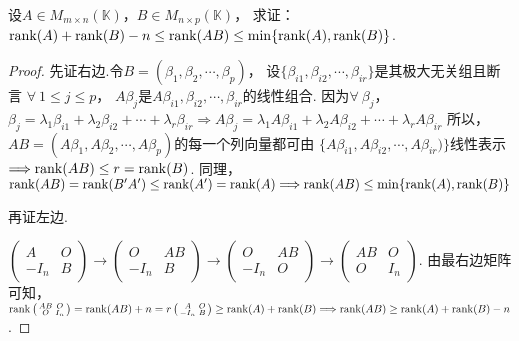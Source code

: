\begin{example}
  设\( A \in M_{m\times n}(\mathbb{K}) \)，\( B \in M_{n\times p}(\mathbb{K}) \)，
  求证：\( \operatorname{rank}(A)+\operatorname{rank}(B)-n\leq \operatorname{rank}(AB)\leq \min\{\operatorname{rank}(A),\operatorname{rank}(B)\} \).
\end{example}

\begin{proof}
  先证右边.令\( B=(\beta_1,\beta_2,\cdots,\beta_p) \)，
  设\(\{\beta_{i1},\beta_{i2},\cdots,\beta_{ir}\}\)是其极大无关组且断言
  \( \forall ~1 \leq j \leq p \)，
  \( A\beta_j \)是\(A\beta_{i1},\beta_{i2},\cdots,\beta_{ir}\)的线性组合.
  因为\( \forall ~\beta_j \)，
  \(\beta_j = \lambda_1\beta_{i1}+\lambda_2\beta_{i2}+\cdots+\lambda_r\beta_{ir}
  \Longrightarrow
  A\beta_j=\lambda_1 A \beta_{i1}+\lambda_2 A \beta_{i2}+\cdots+\lambda_r A \beta_{ir}\)
  所以，\( AB=(A\beta_1,A\beta_2,\cdots,A\beta_p)\)的每一个列向量都可由
  \( \{A\beta_{i1},A\beta_{i2},\cdots,A\beta_{ir})\} \)线性表示
  \( \Longrightarrow \operatorname{rank}(AB) \leq r = \operatorname{rank}(B)\).
  同理，\( \operatorname{rank}(AB)=\operatorname{rank}(B'A')\leq \operatorname{rank}(A')=\operatorname{rank}(A) \Longrightarrow
  \operatorname{rank}(AB) \leq \min\{\operatorname{rank}(A),\operatorname{rank}(B)\}\)

  再证左边.

  \( \left(\begin{smallmatrix}
      A & O \\
      -I_n & B \end{smallmatrix}\right) \longrightarrow
      \left(\begin{smallmatrix}
      O & AB \\
      -I_n & B \end{smallmatrix}\right) \longrightarrow
      \left(\begin{smallmatrix}
      O & AB \\
      -I_n & O \end{smallmatrix}\right) \longrightarrow
      \left(\begin{smallmatrix}
      AB & O \\
      O  & I_n \end{smallmatrix}\right)\).
  由最右边矩阵可知， \( \operatorname{rank}\left(\begin{smallmatrix}
      AB & O \\
      O  & I_n\end{smallmatrix}\right) = \operatorname{rank}(AB)+n=
      r\left(\begin{smallmatrix}
      A & O \\
      -I_n & B \end{smallmatrix}\right) \geq \operatorname{rank}(A) + \operatorname{rank}(B) \Longrightarrow
  \operatorname{rank}(AB)\geq \operatorname{rank}(A)+\operatorname{rank}(B)-n \). 
\end{proof}

